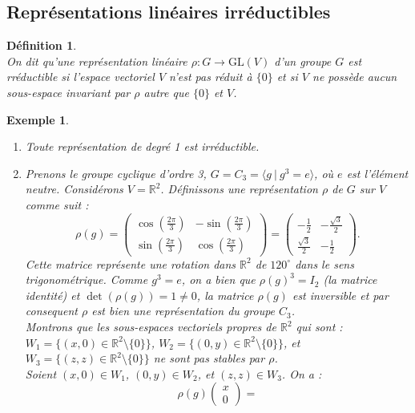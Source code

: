 \documentclass[a4paper, 14pt]{report}
\newtheorem{definition}{Définition}[section]
\newtheorem{example}{Exemple}[section]
\begin{document}
\begin{onehalfspace}
{\section{Représentations linéaires irréductibles}
\begin{definition}  \cite{serre1971representation} \\
On dit qu'une représentation linéaire \( \rho : G \rightarrow \mathrm{GL}(V) \) d'un groupe \(G\) est rréductible si l'espace vectoriel \( V \) n'est pas réduit à \( \{0\} \) et si \( V \) ne possède aucun sous-espace invariant par \( \rho \) autre que \( \{0\} \) et \( V \).	
\end{definition}

\begin{example} 
	\begin{enumerate} \
		\item Toute représentation de degré 1 est irréductible.
		\item Prenons le groupe cyclique d'ordre 3, \( G = C_3 = \langle g \ | \ g^3 = e \rangle \), où \( e \) est l'élément neutre.
		Considérons \( V = \mathbb{R}^2 \). Définissons une représentation \( \rho \) de \( G \) sur \( V \) comme suit :
		\[
		\rho(g) =
		\begin{pmatrix}
			\cos\left(\frac{2\pi}{3}\right) & -\sin\left(\frac{2\pi}{3}\right) \\
			\sin\left(\frac{2\pi}{3}\right) & \cos\left(\frac{2\pi}{3}\right)
		\end{pmatrix}
		=
		\begin{pmatrix}
			-\frac{1}{2} & -\frac{\sqrt{3}}{2} \\
			\frac{\sqrt{3}}{2} & -\frac{1}{2}
		\end{pmatrix}.
		\]
Cette matrice représente une rotation dans \( \mathbb{R}^2 \) de \( 120^\circ \) dans le sens trigonométrique. Comme \( g^3 = e \), on a bien que \( \rho(g)^3 = I_2 \) (la matrice identité) et \(\det(\rho(g))=1 \neq 0\), la matrice \(\rho(g)\) est inversible et par consequent \( \rho \) est bien une représentation du groupe \( C_3 \).\\
Montrons que les sous-espaces vectoriels propres de \( \mathbb{R}^2 \) qui sont : 
		\( W_1 = \{ (x, 0) \in \mathbb{R}^2 \setminus \{0\} \} \), 
		\( W_2 = \{ (0, y) \in \mathbb{R}^2 \setminus \{0\} \} \), 
		et 
		\( W_3 = \{ (z, z) \in \mathbb{R}^2 \setminus \{0\} \} \) 
		ne sont pas stables par \( \rho \).\\
		Soient \( (x, 0) \in W_1 \), \( (0, y) \in W_2 \), et \( (z, z) \in W_3 \). On a :
		\[
		\rho(g) \begin{pmatrix} x \\ 0 \end{pmatrix} = 
\]
\end{enumerate}
\end{example}}
\end{onehalfspace}
\end{document}
